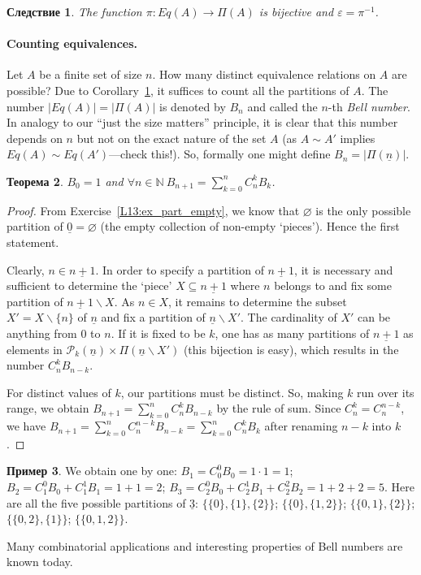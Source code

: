 \documentclass[12pt,notitlepage]{article}
\theoremstyle{plain}
\newtheorem{thm}{Теорема}[section]
\newtheorem{corr}[thm]{Следствие}
\theoremstyle{definition}
\newtheorem{exm}[thm]{Пример}
\theoremstyle{plain}
\newcommand{\N}{\mathbb{N}}
\newcommand{\sbs}{\subseteq}
\renewcommand{\setminus}{\smallsetminus}
\newcommand{\void}{\varnothing}
\newcommand{\mP}{\mathcal{P}}
\newcommand{\eps}{\varepsilon}
\newcommand{\ul}[1]{\underline{#1}}
\newcommand{\1}{\mathbf{1}}
\newcommand{\0}{\mathbf{0}}
\begin{document}
\begin{corr}\label{L13:eq_part}
	The function $\pi\colon Eq(A) \to \Pi(A)$ is bijective and $\eps = \pi^{-1}$.
\end{corr}

\paragraph{Counting equivalences.}
Let $A$ be a finite set of size $n$. How many distinct equivalence relations on $A$ are possible? Due to Corollary~\ref{L13:eq_part}, it suffices to count all the partitions of $A$. The number $|Eq(A)| = |\Pi(A)|$ is denoted by $B_n$ and called the $n$-th \emph{Bell number}. In analogy to our ``just the size matters'' principle, it is clear that this number depends on $n$ but not on the exact nature of the set $A$ (as $A \sim A'$ implies $Eq(A) \sim Eq(A')$---check this!). So, formally one might define $B_n = |\Pi(\ul{n})|$.

\begin{thm}
	$B_0 = 1$ and $\forall n \in \N\ B_{n + 1} = \sum_{k = 0}^{n} C_n^k B_k$.
\end{thm}
\begin{proof}
	From Exercise~\ref{L13:ex_part_empty}, we know that $\void$ is the only possible partition of $\ul{0} = \void$ (the empty collection of non-empty `pieces'). Hence the first statement.
	
	Clearly, $n \in \ul{n+1}$. In order to specify a partition of $\ul{n+1}$, it is necessary and sufficient to determine the `piece' $X \sbs \ul{n+1}$ where $n$ belongs to and fix some partition of $\ul{n+1} \setminus X$. As $n \in X$, it remains to determine the subset $X' = X \setminus \{n\}$ of $\ul{n}$ and fix a partition of $\ul{n} \setminus X'$. The cardinality of $X'$ can be anything from $0$ to $n$. If it is fixed to be $k$, one has as many partitions of $\ul{n+1}$ as elements in $\mP_{k}(\ul{n}) \times \Pi(\ul{n} \setminus X')$ (this bijection is easy), which results in the number $C^k_n B_{n-k}$.
	
	For distinct values of $k$, our partitions must be distinct. So, making $k$ run over its range, we obtain $B_{n+1} = \sum_{k=0}^n C^k_n B_{n-k}$ by the rule of sum. Since $C^k_n = C^{n - k}_n$, we have $B_{n+1} = \sum_{k=0}^n C^{n-k}_n B_{n-k} = \sum_{k=0}^n C^k_n B_k$ after renaming $n - k$ into $k$.
\end{proof}
\begin{exm}
	We obtain one by one: $B_1 = C_0^0 B_0 = 1\cdot 1 = 1$; $B_2 = C_1^0 B_0 + C_1^1 B_1 = 1 + 1 = 2$; $B_3 = C_2^0 B_0 + C_2^1 B_1 + C_2^2 B_2 = 1 + 2 + 2 = 5$. Here are all the five possible partitions of $\ul{3}$: $\{\{0\}, \{1\}, \{2\} \}$; $\{\{0\}, \{1, 2\} \}$; $\{\{0, 1\}, \{2\} \}$; $\{\{0, 2\}, \{1\} \}$; $\{\{0, 1, 2\} \}$.
\end{exm}
\noindent Many combinatorial applications and interesting properties of Bell numbers are known today.
\end{document}

